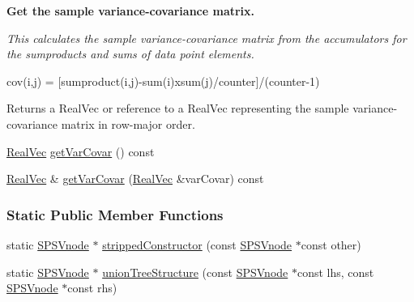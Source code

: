 \begin{Indent}{\bf \-Get the sample variance-\/covariance matrix.}\par
{\em \-This calculates the sample variance-\/covariance matrix from the accumulators for the sumproducts and sums of data point elements.

cov(i,j) = \mbox{[}sumproduct(i,j)-\/sum(i)xsum(j)/counter\mbox{]}/(counter-\/1)

\begin{DoxyReturn}{\-Returns}
a \-Real\-Vec or reference to a \-Real\-Vec representing the sample variance-\/covariance matrix in row-\/major order. 
\end{DoxyReturn}
}\begin{DoxyCompactItemize}
\item 
\hyperlink{namespacesubpavings_af2d57bb6e12f4a73169f2e496d6a641f}{\-Real\-Vec} \hyperlink{classsubpavings_1_1SPSVnode_abdef36aad99bfe53f78d4e8304ac59d6}{get\-Var\-Covar} () const 
\item 
\hyperlink{namespacesubpavings_af2d57bb6e12f4a73169f2e496d6a641f}{\-Real\-Vec} \& \hyperlink{classsubpavings_1_1SPSVnode_a61adf71c4652c4ec29a9dc323174d1a3}{get\-Var\-Covar} (\hyperlink{namespacesubpavings_af2d57bb6e12f4a73169f2e496d6a641f}{\-Real\-Vec} \&var\-Covar) const 
\end{DoxyCompactItemize}
\end{Indent}
\subsubsection*{\-Static \-Public \-Member \-Functions}
\begin{DoxyCompactItemize}
\item 
static \hyperlink{classsubpavings_1_1SPSVnode}{\-S\-P\-S\-Vnode} $\ast$ \hyperlink{classsubpavings_1_1SPSVnode_a0e051b28a89645eb09e8bbccc7b13780}{stripped\-Constructor} (const \hyperlink{classsubpavings_1_1SPSVnode}{\-S\-P\-S\-Vnode} $\ast$const other)
\item 
static \hyperlink{classsubpavings_1_1SPSVnode}{\-S\-P\-S\-Vnode} $\ast$ \hyperlink{classsubpavings_1_1SPSVnode_ad61518c409809cca73c262dbd17d320f}{union\-Tree\-Structure} (const \hyperlink{classsubpavings_1_1SPSVnode}{\-S\-P\-S\-Vnode} $\ast$const lhs, const \hyperlink{classsubpavings_1_1SPSVnode}{\-S\-P\-S\-Vnode} $\ast$const rhs)
\end{DoxyCompactItemize}
